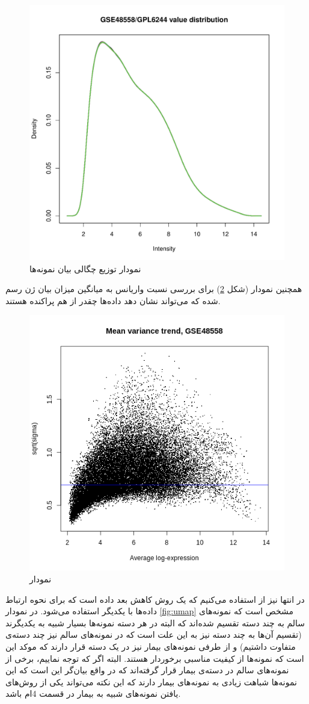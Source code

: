 \documentclass{article}
\begin{document}
\begin{figure}[h!]
	\centering
	\includegraphics[width=0.5\columnwidth]{figs/exp-val-dist.pdf}
	\caption{نمودار توزیع چگالی بیان نمونه‌ها}
	\label{fig:exp-val-dist}
\end{figure}

همچنین نمودار  (شکل \ref{fig:mean-var}) برای بررسی نسبت واریانس به میانگین میزان بیان ژن رسم شده که می‌تواند نشان دهد داده‌‌ها چقدر از هم پراکنده هستند.

\begin{figure}[h!]
	\centering
	\includegraphics[width=0.5\columnwidth]{figs/mean-var.png}
	\caption{نمودار }
	\label{fig:mean-var}
\end{figure}

در انتها نیز از 
استفاده می‌کنیم که یک روش کاهش بعد داده است که برای نحوه ارتباط داده‌ها با یکدیگر استفاده می‌شود. در نمودار \ref{fig:umap} مشخص است که نمونه‌های سالم به چند دسته تقسیم شده‌اند که البته در هر دسته نمونه‌ها بسیار شبیه به یکدیگرند (تقسیم آن‌ها به چند دسته نیز به این علت است که در نمونه‌های سالم نیز چند دسته‌ی متفاوت داشتیم) و از طرفی نمونه‌های بیمار نیز در یک دسته قرار دارند که موکد این است که نمونه‌ها از کیفیت مناسبی برخوردار هستند. البته اگر که توجه نماییم، برخی از نمونه‌های سالم در دسته‌ی بیمار قرار گرفته‌اند که در واقع بیان‌گر این است که این نمونه‌ها شباهت زیادی به نمونه‌های بیمار دارند که این نکته می‌تواند یکی از روش‌های یافتن نمونه‌های شبیه به بیمار در قسمت 4‌ام باشد.
\end{document}
